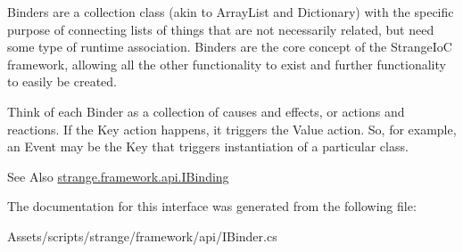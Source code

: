 Binders are a collection class (akin to Array\-List and Dictionary) with the specific purpose of connecting lists of things that are not necessarily related, but need some type of runtime association. Binders are the core concept of the Strange\-Io\-C framework, allowing all the other functionality to exist and further functionality to easily be created.

Think of each Binder as a collection of causes and effects, or actions and reactions. If the Key action happens, it triggers the Value action. So, for example, an Event may be the Key that triggers instantiation of a particular class.

\begin{DoxySeeAlso}{See Also}
\hyperlink{interfacestrange_1_1framework_1_1api_1_1_i_binding}{strange.\-framework.\-api.\-I\-Binding} 
\end{DoxySeeAlso}


The documentation for this interface was generated from the following file\-:\begin{DoxyCompactItemize}
\item 
Assets/scripts/strange/framework/api/I\-Binder.\-cs\end{DoxyCompactItemize}
